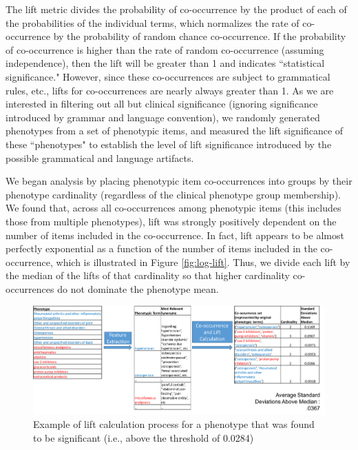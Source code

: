 \documentclass{sig-alternate}
\begin{document}
The lift metric divides the probability of co-occurrence by the product of each of the probabilities of the individual terms, which normalizes the rate of co-occurrence by the probability of random chance co-occurrence.
If the probability of co-occurrence is higher than the rate of random co-occurrence (assuming independence), then the lift will be greater than 1 and indicates ``statistical significance."
However, since these co-occurrences are subject to grammatical rules, etc., lifts for co-occurrences are nearly always greater than 1.
As we are interested in filtering out all but clinical significance (ignoring significance introduced by grammar and language convention), we randomly generated phenotypes from a set of phenotypic items, and measured the lift significance of these ``phenotypes" to establish the level of lift significance introduced by the possible grammatical and language artifacts.

We began analysis by placing phenotypic item co-occurrences into groups by their phenotype cardinality (regardless of the clinical phenotype group membership). 
We found that, across all co-occurrences among phenotypic items (this includes those from multiple phenotypes), lift was strongly positively dependent on the number of items included in the co-occurrence.
In fact, lift appears to be almost perfectly exponential as a function of the number of items included in the co-occurrence, which is illustrated in Figure \ref{fig:log-lift}. 
Thus, we divide each lift by the median of the lifts of that cardinality so that higher cardinality co-occurrences do not dominate the phenotype mean. 

\begin{figure} [t]
\centering
\includegraphics[width=\linewidth]{lift-process-cartoon.png}
\caption{Example of lift calculation process for a phenotype that was found to be significant (i.e., above the threshold of 0.0284)}
\label{fig:lift-process-cartoon}
\end{figure}


\end{document}
